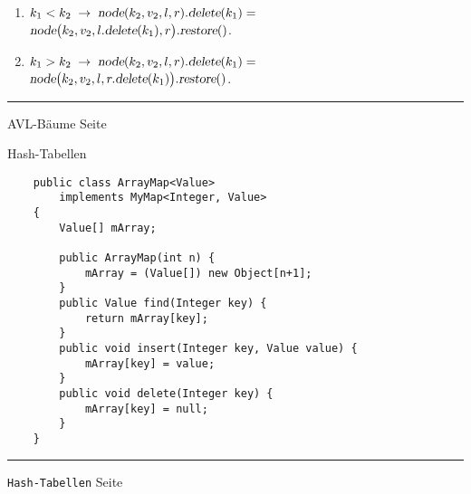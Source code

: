 \documentclass{slides}
\newcounter{mypage}
\begin{document}
\begin{slide}{}
\begin{enumerate}
\item $k_1 < k_2 \;\rightarrow\; \textsl{node}(k_2,v_2,l,r)\mathtt{.}\textsl{delete}(k_1) =$ \\[0.1cm]
       \hspace*{3.1cm} 
      $\textsl{node}\bigl(k_2,v_2,l\mathtt{.}\textsl{delete}(k_1),r\bigr).\textsl{restore}()$.
\item $k_1 > k_2 \;\rightarrow\; \textsl{node}(k_2,v_2,l,r)\mathtt{.}\textsl{delete}(k_1) =$ \\[0.1cm]
       \hspace*{3.1cm} 
      $\textsl{node}\bigl(k_2,v_2,l,r\mathtt{.}\textsl{delete}(k_1)\bigr).\textsl{restore}()$.
\end{enumerate}


\vspace*{\fill}
\tiny \addtocounter{mypage}{1}
\rule{17cm}{1mm}
AVL-B\"aume \hspace*{\fill} Seite 
\end{slide}


\begin{slide}{}
\normalsize

\begin{center}
Hash-Tabellen
\end{center}
\vspace*{0.5cm}

\footnotesize
\begin{verbatim}
    public class ArrayMap<Value> 
        implements MyMap<Integer, Value>
    {
        Value[] mArray;
        
        public ArrayMap(int n) {
            mArray = (Value[]) new Object[n+1];
        }
        public Value find(Integer key) {
            return mArray[key];
        }
        public void insert(Integer key, Value value) {
            mArray[key] = value;
        }
        public void delete(Integer key) {
            mArray[key] = null;
        }
    }
\end{verbatim}

\vspace*{\fill}
\tiny \addtocounter{mypage}{1}
\rule{17cm}{1mm}
\texttt{Hash-Tabellen} \hspace*{\fill} Seite 
\end{slide}

\end{document}
